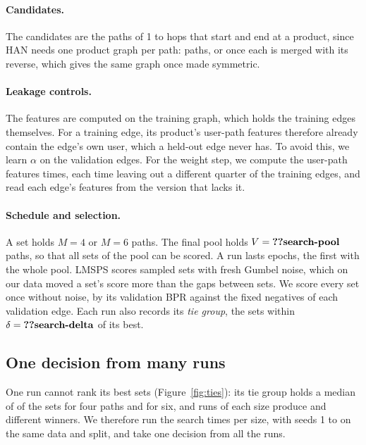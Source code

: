 \paragraph{Candidates.} The candidates are the paths of 1 to  hops that start and
end at a product, since HAN needs one product graph per path:  paths, or
 once each is merged with its reverse, which gives the same graph once made
symmetric.

\paragraph{Leakage controls.} The features are computed on the training graph, which holds the
training edges themselves. For a training edge, its product's user-path features therefore already
contain the edge's own user, which a held-out edge never has. To avoid this, we learn $\alpha$ on
the validation edges. For the weight step, we compute the user-path features 
times, each time leaving out a different quarter of the training edges, and read each edge's
features from the version that lacks it.

\paragraph{Schedule and selection.} A set holds $M = 4$ or $M = 6$ paths. The final pool holds
$V = \val{search-pool}$ paths, so that all  sets of the pool can be scored. A run
lasts  epochs, the first  with the whole pool. LMSPS scores
sampled sets with fresh Gumbel noise, which on our data moved a set's score more than the gaps
between sets. We score every set once without noise, by its validation BPR against the
 fixed negatives of each validation edge. Each run also records its
\emph{tie group}, the sets within $\delta = \val{search-delta}$ of its best.

\subsection{One decision from many runs}
\label{sec:fleet}

One run cannot rank its best sets (Figure~\ref{fig:ties}): its tie group holds a median of
 of the  sets for four paths and  for
six, and  runs of each size produce  and
 different winners. We therefore run the search  times per
size, with seeds 1 to  on the same data and split, and take one decision from all
the runs.

